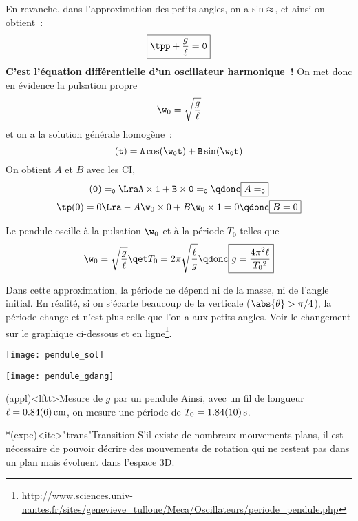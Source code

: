 \documentclass[../../main/main.tex]{subfiles}
\begin{document}
En revanche, dans l'approximation des petits angles, on a $\sin\tt\approx\tt$,
et ainsi on obtient~:
\[\boxed{\tpp + \frac{g}{\ell}\tt = 0}\]
\textbf{C'est l'équation différentielle d'un oscillateur harmonique~!} On met
donc en évidence la pulsation propre
\[\w_0 = \sqrt{\frac{g}{\ell}}\]
et on a la solution générale homogène~:
\[\tt(t) = A\cos(\w_0t) + B\sin(\w_0t)\]
On obtient $A$ et $B$ avec les CI,
\begin{gather*}
	\tt(0) = \tt_0
	\Lra A\times 1 + B\times 0 = \tt_0
	\qdonc
	\boxed{A = \tt_0}\\
	\tp(0) = 0
	\Lra -A\w_0\times 0 + B\w_0\times 1 = 0
	\qdonc
	\boxed{B = 0}
\end{gather*}

Le pendule oscille à la pulsation $\w_0$ et à la période $T_0$ telles que
\[
	\w_0 = \sqrt{\frac{g}{\ell}}
	\qet
	T_0 = 2\pi \sqrt{\frac{\ell}{g}}
	\qdonc
	\boxed{g = \frac{4\pi^2\ell}{T_0{}^2}}
\]

Dans cette approximation, la période ne dépend ni de la masse, ni de l'angle
initial. En réalité, si on s'écarte beaucoup de la verticale ($\abs{\theta} >
	\pi/4$), la période change et n'est plus celle que l'on a aux petits angles.
Voir le changement sur le graphique ci-dessous et en
ligne\footnote{\url{http://www.sciences.univ-nantes.fr/sites/genevieve_tulloue/Meca/Oscillateurs/periode_pendule.php}}.

\begin{minipage}{0.45\linewidth}
	\begin{center}
		\texttt{[image: pendule\_sol]}
	\end{center}
\end{minipage}
\hfill
\begin{minipage}{0.45\linewidth}
	\begin{center}
		\texttt{[image: pendule\_gdang]}
	\end{center}
\end{minipage}

\begin{tcb*}(appl)<lftt>{Mesure de $g$ par un pendule}
	Ainsi, avec un fil de longueur $\ell = \SI{0.84\pm0.06}{cm}$, on mesure une
	période de $T_0 = \SI{1.84\pm0.1}{s}$. \smallbreak
\end{tcb*}

\begin{tcb}*(expe)<itc>"trans"{Transition}
	S'il existe de nombreux mouvements plans, il est nécessaire de pouvoir
	décrire des mouvements de rotation qui ne restent pas dans un plan mais
	évoluent dans l'espace 3D.
\end{tcb}
\end{document}
